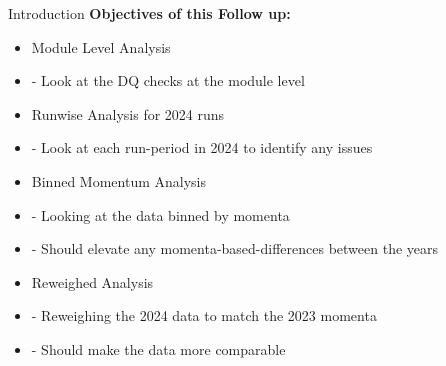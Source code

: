 \begin{frame}{Introduction}
    \textbf{Objectives of this Follow up:}
    \begin{itemize}
        \item Module Level Analysis
        \item[] - Look at the DQ checks at the module level
        \item Runwise Analysis for 2024 runs
        \item[] - Look at each run-period in 2024 to identify any issues
        \item Binned Momentum Analysis
        \item[] - Looking at the data binned by momenta 
        \item[] - Should elevate any momenta-based-differences between the years
        \item Reweighed Analysis
        \item[] - Reweighing the 2024 data to match the 2023 momenta
        \item[] - Should make the data more comparable
    \end{itemize}
\end{frame}